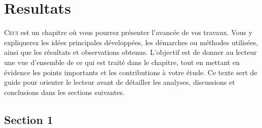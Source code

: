 

\graphicspath{{5_Images/7_Resultats/}}                          %
\makeatletter
{}                        %
\makeatother


\chapter{Resultats}\label{chap:Resultats}                       %

\begin{chapabstract}                                            %
    \lettrine[slope=0.5em,nindent=0.5em]{C}{eci}
    est un chapitre où vous pourrez présenter l’avancée de vos travaux. Vous y expliquerez les idées principales développées, les démarches ou méthodes utilisées, ainsi que les résultats et observations obtenus. L’objectif est de donner au lecteur une vue d’ensemble de ce qui est traité dans le chapitre, tout en mettant en évidence les points importants et les contributions à votre étude. Ce texte sert de guide pour orienter le lecteur avant de détailler les analyses, discussions et conclusions dans les sections suivantes.
\end{chapabstract}

\minitoc%
\newpage                                                        %


\section{Section 1}\label{sec:1_1}

